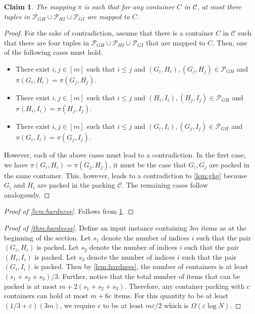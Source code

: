 \documentclass[10pt,a4paper]{amsart}
\newcommand{\eps}{\varepsilon}
\newtheorem{lemma}[theorem]{Lemma}
\newtheorem{claim}[theorem]{Claim}
\theoremstyle{definition}
\begin{document}
\begin{claim}
\label{claim:mapping}
    The mapping $\pi$ is such that for any container $C$ in $\mathcal C$, at most three tuples in $\mathcal P_{GH}\cup \mathcal P_{HI}\cup \mathcal P_{GI}$ are mapped to $C$.
\end{claim}
\begin{proof}
    For the sake of contradiction, assume that there is a container $C$ in $\mathcal C$ such that there are four tuples in $\mathcal P_{GH}\cup \mathcal P_{HI}\cup \mathcal P_{GI}$ that are mapped to $C$.
    Then, one of the following cases must hold.
    \begin{itemize}
        \item There exist $i,j\in[m]$ such that $i\le j$ and $(G_i,H_i),(G_j,H_j)\in \mathcal P_{GH}$ and $\pi(G_i,H_i)=\pi(G_j,H_j)$.
        \item There exist $i,j\in[m]$ such that $i\le j$ and $(H_i,I_i),(H_j,I_j)\in \mathcal P_{GH}$ and $\pi(H_i,I_i)=\pi(H_j,I_j)$.
        \item There exist $i,j\in[m]$ such that $i\le j$ and $(G_i,I_i),(G_j,I_j)\in \mathcal P_{GH}$ and $\pi(G_i,I_i)=\pi(G_j,I_j)$.
    \end{itemize}
    However, each of the above cases must lead to a contradiction. 
    In the first case, we have $\pi(G_i,H_i)=\pi(G_j,H_j)$, it must be the case that $G_i,G_j$ are packed in the same container.
    This, however, leads to a contradiction to \cref{lem:ghg} because $G_i$ and $H_i$ are packed in the packing $\mathcal C$. The remaining cases follow analogously.
\end{proof}
\begin{proof}[Proof of \cref{lem:hardness}]
    Follows from \cref{claim:mapping}.
\end{proof}
\begin{proof}[Proof of \cref{thm:hardness}]
    Define an input instance containing $3m$ items as at the beginning of the section. 
    Let $s_1$ denote the number of indices $i$ such that the pair $(G_i,H_i)$ is packed.
    Let $s_2$ denote the number of indices $i$ such that the pair $(H_i,I_i)$ is packed.
    Let $s_3$ denote the number of indices $i$ such that the pair $(G_i,I_i)$ is packed.
    Then by \cref{lem:hardness}, the number of containers is at least $(s_1+s_2+s_3)/3$. Further, notice that
    the total number of items that can be packed is at most $m+2(s_1+s_2+s_3)$. Therefore, any container packing with $c$ containers can hold at most $m+6c$ items. For this quantity to be at least
    $(1/3+\eps)(3m)$, we require $c$ to be at least $m\eps/2$ which is $\Omega(\eps\log N)$.
\end{proof}
    
\end{document}
